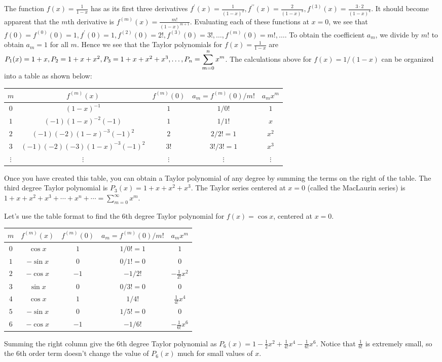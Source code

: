 The function $f(x)=\frac{1}{1-x}$ has as its first three derivatives $f^\prime(x) = \frac{1}{(1-x)^2}, f^{\prime\prime}(x) = \frac{2}{(1-x)^3},f^{(3)}(x) = \frac{3\cdot 2}{(1-x)^4}$.  It should become apparent that the $m$th derivative is $f^{(m)}(x) =  \frac{m!}{(1-x)^{m+1}}$.  Evaluating each of these functions at $x=0$, we see that $f(0)=f^{(0)}(0)=1, f^\prime(0)=1, f^{(2)}(0)=2!,f^{(3)}(0)=3!,\ldots, f^{(m)}(0)=m!,\ldots$. To obtain the coefficient $a_m$, we divide by $m!$ to obtain $a_m=1$ for all $m$.  Hence we see that the Taylor polynomials for $f(x)=\frac{1}{1-x}$ are $P_1(x) = 1+x, P_2=1+x+x^2,P_3=1+x+x^2+x^3,\ldots,\displaystyle P_n = \sum_{m=0}^n x^m$. The calculations above for $f(x)=1/(1-x)$ can be organized into a table as shown below:
\begin{center}
\begin{tabular}{|c|c|c|c|c|}\hline
$m$ & $f^{(m)}(x)$ & $f^{(m)}(0)$ & $a_m=f^{(m)}(0)/m!$  & $a_m x^m$
\\\hline
$0$ & $(1-x)^{-1}$ & $1$ & $1/0!$ & $1$
\\\hline
$1$ & $(-1)(1-x)^{-2}(-1)$ & $1$ & $1/1!$ & $x$
\\\hline
$2$ & $(-1)(-2)(1-x)^{-3}(-1)^2$ & $2$ & $2/2!=1$ & $x^2$
\\\hline
$3$ & $(-1)(-2)(-3)(1-x)^{-3}(-1)^2$ & $3!$ & $3!/3!=1$ & $x^3$
\\\hline
$\vdots$ & $\vdots$ & $\vdots$ & $\vdots$ & $\vdots$
\end{tabular}
\end{center}
Once you have created this table, you can obtain a Taylor polynomial of any degree by summing the terms on the right of the table. The third degree Taylor polynomial is $P_3(x) = 1+x+x^2+x^3$. The Taylor series centered at $x=0$ (called the MacLaurin series) is $1+x+x^2+x^3+\cdots+x^n+\cdots = \sum_{m=0}^\infty x^m$.

Let's use the table format to find the 6th degree Taylor polynomial for $f(x)=\cos x$, centered at $x=0$.
\begin{center}
\begin{tabular}{|c|c|c|c|c|}\hline
$m$ & $f^{(m)}(x)$ & $f^{(m)}(0)$ & $a_m=f^{(m)}(0)/m!$  & $a_m x^m$
\\\hline
$0$ & $\cos x$ & $1$ & $1/0!=1$ & $1$
\\\hline
$1$ & $-\sin x$ & $0$ & $0/1!=0$ & $0$
\\\hline
$2$ & $-\cos x$ & $-1$ & $-1/2!$ & $-\frac{1}{2!}x^2$
\\\hline
$3$ & $\sin x$ & $0$ & $0/3!=0$ & $0$
\\\hline
$4$ & $\cos x$ & $1$ & $1/4!$ & $\frac{1}{4!}x^4$
\\\hline
$5$ & $-\sin x$ & $0$ & $1/5!=0$ & $0$
\\\hline
$6$ & $-\cos x$ & $-1$ & $-1/6!$ & $-\frac{1}{6!}x^6$
\\\hline
\end{tabular}
\end{center}
Summing the right column give the 6th degree Taylor polynomial as $P_6(x) = 1-\frac{1}{2}x^2 +\frac{1}{4!}x^4-\frac{1}{6!}x^6$.  Notice that $\frac{1}{6!}$ is extremely small, so the 6th order term doesn't change the value of $P_6(x)$ much for small values of $x$. 

